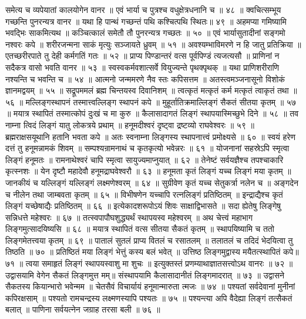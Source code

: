 समेत्य च व्यपेयातां कालयोगेन वानर ॥
एवं भार्या च पुत्रश्च वधुक्षेत्रधनानि च ॥ ४८ ॥
क्वचित्सम्भूय गच्छन्ति पुनरन्यत्र वानर ॥
यथा हि पान्थं गच्छन्तं पथि कश्चित्पथि स्थितः॥ ४९ ॥
अहमप्या गमिष्यामि भवद्भिः साकमित्यथ ॥
कञ्चित्कालं समेतौ तौ पुनरन्यत्र गच्छतः ॥ ५० ॥
एवं भार्यासुतादीनां सङ्गमो नश्वरः कपे ॥
शरीरजन्मना साकं मृत्युः सञ्जायते ध्रुवम् ॥ ५१ ॥
अवश्यम्भाविमरणे न हि जातु प्रतिक्रिया ॥
एतच्छरीरपाते तु देही कर्मगतिं गतः ॥ ५२ ॥
प्राप्य पिण्डान्तरं वत्स पूर्वपिण्डं त्यजत्यसौ ॥
प्राणिनां न सदैकत्र वासो भवति वानर ॥ ५३ ॥
स्वस्वकर्मवशात्सर्वे वियुज्यन्ते पृथक्पृथक् ॥
यथा प्राणिशरीराणि नश्यन्ति च भवन्ति च ॥ ५४ ॥
आत्मनो जन्ममरणे नैव स्तः कपिसत्तम ॥
अतस्त्वमञ्जनासूनो विशोकं ज्ञानमद्वयम् ॥ ५५ ॥
सद्रूपममलं ब्रह्म चिन्तयस्व दिवानिशम् ॥
त्वत्कृतं मत्कृतं कर्म मत्कृतं त्वाकृतं तथा ॥ ५६ ॥
मल्लिङ्गस्थापनं तस्मात्त्वल्लिङ्ग स्थापनं कपे ॥
मुहूर्तातिक्रमाल्लिङ्गं सैकतं सीतया कृतम् ॥ ५७ ॥
मयात्र स्थापितं तस्मात्कोपं दुःखं च मा कुरु ॥
कैलासादागतं लिङ्गं स्थापयास्मिच्छुभे दिने ॥ ५८ ॥
तव नाम्ना त्विदं लिङ्गं यातु लोकत्रये प्रथाम् ॥
हनूमदीश्वरं दृष्ट्वा द्रष्टव्यो राघवेश्वरः ॥ ५९ ॥
ब्रह्मराक्षसयूथानि हतानि भवता कपे ॥
अतः स्वनाम्ना लिङ्गस्य स्थापनात्त्वं प्रमोक्ष्यसे ॥ ६० ॥
स्वयं हरेण दत्तं तु हनूमन्नामकं शिवम् ॥
सम्पश्यन्रामनाथं च कृतकृत्यो भवेन्नरः ॥ ६१ ॥
योजनानां सहस्रेऽपि स्मृत्वा लिङ्गं हनूमतः ॥
रामनाथेश्वरं चापि स्मृत्वा सायुज्यमाप्नुयात् ॥ ६२ ॥
तेनेष्टं सर्वयज्ञैश्च तपश्चाकारि कृत्स्नशः ॥
येन दृष्टौ महादेवौ हनूमद्राघवेश्वरौ ॥ ६३ ॥
हनूमता कृतं लिङ्गं यच्च लिङ्गं मया कृतम् ॥
जानकीयं च यल्लिङ्गं यल्लिङ्गं लक्ष्मणेश्वरम् ॥ ६४ ॥
सुग्रीवेण कृतं यच्च सेतुकर्त्रा नलेन च ॥
अङ्गदेन च नीलेन तथा जाम्बवता कृतम् ॥ ६५ ॥
विभीषणेन यच्चापि रत्नलिङ्गं प्रतिष्ठितम् ॥
इन्द्राद्यैश्च कृतं लिङ्गं यच्छेषाद्यैः प्रतिष्ठितम् ॥ ६६ ॥
इत्येकादशरूपोऽयं शिवः साक्षाद्विभासते ॥
सदा ह्येतेषु लिङ्गेषु सन्निधत्ते महेश्वरः ॥ ६७ ॥
तत्स्वपापौघशुद्ध्यर्थं स्थापयस्व महेश्वरम् ॥
अथ चेत्त्वं महाभाग लिङ्गमुत्सादयिष्यसि ॥ ६८ ॥
मयात्र स्थापितं वत्स सीतया सैकतं कृतम् ॥
स्थापयिष्यामि च ततो लिङ्गमेतत्त्वया कृतम् ॥ ६९ ॥
पातालं सुतलं प्राप्य वितलं च रसातलम् ॥
तलातलं च तदिदं भेदयित्वा तु तिष्ठति ॥ ७० ॥
प्रतिष्ठितं मया लिङ्गं भेत्तुं कस्य बलं भवेत् ॥
उत्तिष्ठ लिङ्गमुद्वास्य मयैतत्स्थापितं कपे॥ ७१ ॥
त्वया समाहृतं लिङ्गं स्थापयस्वाशु मा शुचः ॥
इत्युक्तस्तं प्रणम्याथाज्ञातसत्त्वोऽथ वानरः ॥ ७२ ॥
उद्वासयामि वेगेन सैकतं लिङ्गमुत्त मम्॥
संस्थापयामि कैलासादानीतं लिङ्गमादरात् ॥ ७३ ॥
उद्वासने सैकतस्य कियान्भारो भवेन्मम ॥
चेतसैवं विचार्यायं हनूमान्मारुता त्मजः ॥ ७४ ॥
पश्यतां सर्वदेवानां मुनीनां कपिरक्षसाम् ॥
पश्यतो रामचन्द्रस्य लक्ष्मणस्यापि पश्यतः ॥ ७५ ॥
पश्यन्त्या अपि वैदेह्या लिङ्गं तत्सैकतं बलात् ॥
पाणिना सर्वयत्नेन जग्राह तरसा बली ॥ ७६ ॥
